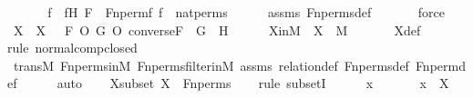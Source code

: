 \begin{isabellebody}
%
\isadelimproof
%
\endisadelimproof
%
\isatagproof
{}\isamarkupfalse%
\ {\isacharminus}{\kern0pt}\ \isanewline
\ \ \isamarkupfalse%
\ f\ \ fH{\isacharcolon}{\kern0pt}\ {\isachardoublequoteopen}F\ {\isacharequal}{\kern0pt}\ Fn{\isacharunderscore}{\kern0pt}perm{\isacharprime}{\kern0pt}{\isacharparenleft}{\kern0pt}f{\isacharparenright}{\kern0pt}{\isachardoublequoteclose}\ {\isachardoublequoteopen}f\ {\isasymin}\ nat{\isacharunderscore}{\kern0pt}perms{\isachardoublequoteclose}\isanewline
\ \ \ \ \isamarkupfalse%
\ assms\ Fn{\isacharunderscore}{\kern0pt}perms{\isacharunderscore}{\kern0pt}def\ \isanewline
\ \ \ \ \isamarkupfalse%
\ force\isanewline
\isanewline
\ \ \isamarkupfalse%
\ X\ \ {\isachardoublequoteopen}X\ {\isasymequiv}\ {\isacharbraceleft}{\kern0pt}\ F\ O\ G\ O\ converse{\isacharparenleft}{\kern0pt}F{\isacharparenright}{\kern0pt}\ {\isachardot}{\kern0pt}\ G\ {\isasymin}\ H\ {\isacharbraceright}{\kern0pt}{\isachardoublequoteclose}\ \isanewline
\isanewline
\ \ \isamarkupfalse%
\ XinM\ {\isacharcolon}{\kern0pt}\ {\isachardoublequoteopen}X\ {\isasymin}\ M{\isachardoublequoteclose}\ \isanewline
\ \ \ \ \isamarkupfalse%
\ X{\isacharunderscore}{\kern0pt}def\isanewline
\ \ \ \ \isamarkupfalse%
{\isacharparenleft}{\kern0pt}rule\ normal{\isacharunderscore}{\kern0pt}comp{\isacharunderscore}{\kern0pt}closed{\isacharparenright}{\kern0pt}\isanewline
\ \ \ \ \isamarkupfalse%
\ transM\ Fn{\isacharunderscore}{\kern0pt}perms{\isacharunderscore}{\kern0pt}in{\isacharunderscore}{\kern0pt}M\ Fn{\isacharunderscore}{\kern0pt}perms{\isacharunderscore}{\kern0pt}filter{\isacharunderscore}{\kern0pt}in{\isacharunderscore}{\kern0pt}M\ assms\ relation{\isacharunderscore}{\kern0pt}def\ Fn{\isacharunderscore}{\kern0pt}perms{\isacharunderscore}{\kern0pt}def\ Fn{\isacharunderscore}{\kern0pt}perm{\isacharprime}{\kern0pt}{\isacharunderscore}{\kern0pt}def\isanewline
\ \ \ \ \isamarkupfalse%
\ auto\isanewline
\isanewline
\ \ \isamarkupfalse%
\ Xsubset{\isacharcolon}{\kern0pt}\ {\isachardoublequoteopen}X\ {\isasymsubseteq}\ Fn{\isacharunderscore}{\kern0pt}perms{\isachardoublequoteclose}\ \isanewline
\ \ \isamarkupfalse%
{\isacharparenleft}{\kern0pt}rule\ subsetI{\isacharparenright}{\kern0pt}\isanewline
\ \ \ \ \isamarkupfalse%
\ x\ \isanewline
\ \ \ \ \isamarkupfalse%
\ {\isachardoublequoteopen}x\ {\isasymin}\ X{\isachardoublequoteclose}\ \isanewline

\end{isabellebody}
